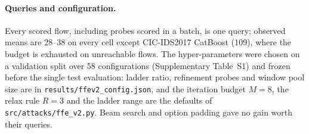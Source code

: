 \paragraph{Queries and configuration.} Every scored flow, including probes scored in a batch, is one query; observed means are 28--38 on every cell except CIC-IDS2017 CatBoost (109), where the budget is exhausted on unreachable flows. The hyper-parameters were chosen on a validation split over 58 configurations (Supplementary Table~S1) and frozen before the single test evaluation: ladder ratio, refinement probes and window pool size are in \texttt{results/ffev2\_config.json}, and the iteration budget $M=8$, the relax rule $R=3$ and the ladder range are the defaults of \texttt{src/attacks/ffe\_v2.py}. Beam search and option padding gave no gain worth their queries.
